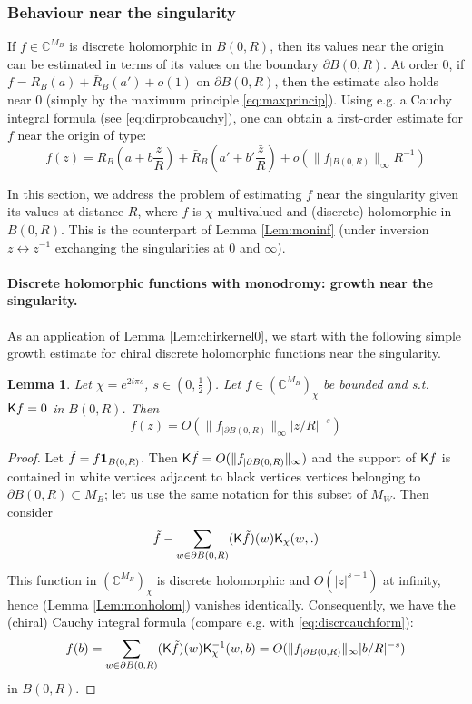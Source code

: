 \documentclass[10pt]{article}
\newcommand{\C}{\mathbb{C}}
\newcommand{\ind}{{\bf 1}}
\newcommand{\rK}{{\sf K}}
\newtheorem{Lem}[thm]{Lemma}
\begin{document}
\subsubsection{Behaviour near the singularity}

If $f\in\C^{M_B}$ is discrete holomorphic in $B(0,R)$, then its values near the origin can be estimated in terms of its values on the boundary $\partial B(0,R)$. At order 0, if $f=R_B(a)+\bar R_B(a')+o(1)$ on $\partial B(0,R)$, then the estimate also holds near $0$ (simply by the maximum principle \eqref{eq:maxprincip}). Using e.g. a Cauchy integral formula (see \eqref{eq:dirprobcauchy}), one can obtain a first-order estimate for $f$ near the origin of type:
$$f(z)=R_B\left(a+b\frac zR\right)+\bar R_B\left(a'+b'\frac{\bar z}R\right)+o(\|f_{|B(0,R)}\|_\infty R^{-1})$$

In this section, we address the problem of estimating $f$ near the singularity given its values at distance $R$, where $f$ is $\chi$-multivalued and (discrete) holomorphic in $B(0,R)$. This is the counterpart of Lemma \ref{Lem:moninf} (under inversion $z\leftrightarrow z^{-1}$ exchanging the singularities at $0$ and $\infty$).


\paragraph{Discrete holomorphic functions with monodromy: growth near the singularity.\\}

As an application of Lemma \ref{Lem:chirkernel0}, we start with the following simple growth estimate for chiral discrete holomorphic functions near the singularity.

\begin{Lem}\label{Lem:monzerogr}
Let $\chi=e^{2i\pi s}$, $s\in (0,\frac 12)$. Let $f\in (\C^{M_B})_\chi$ be bounded and s.t. $\rK f=0$ in $B(0,R)$. Then
$$f(z)=O(\|f_{|\partial B(0,R)}\|_\infty|z/R|^{-s})$$
\end{Lem}
\begin{proof}
Let $\tilde f=f\ind_{B(0,R)}$. Then $\rK \tilde f=O(\|f_{|\partial B(0,R)}\|_\infty)$ and the support of $\rK\tilde f$ is contained in white vertices adjacent to black vertices vertices belonging to $\partial B(0,R)\subset M_B$; let us use the same notation for this subset of $M_W$. Then consider
$$\tilde f-\sum_{w\in\partial B(0,R)}(\rK\tilde f)(w)\rK_\chi(w,.)$$
This function in $(\C^{M_B})_\chi$ is discrete holomorphic and $O(|z|^{s-1})$ at infinity, hence (Lemma \ref{Lem:monholom}) vanishes identically. Consequently, we have the (chiral) Cauchy integral formula (compare e.g. with \eqref{eq:discrcauchform}):
$$f(b)=\sum_{w\in\partial B(0,R)}(\rK\tilde f)(w)\rK_\chi^{-1}(w,b)=O(\lVert f_{|\partial B(0,R)}\rVert_\infty|b/R|^{-s})$$
in $B(0,R)$.
\end{proof}
\end{document}
